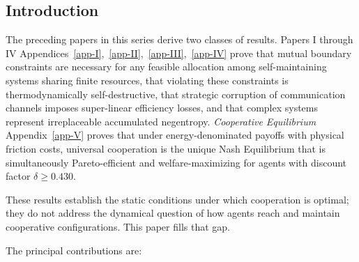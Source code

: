 \documentclass[11pt]{article}
\theoremstyle{plain}
\theoremstyle{definition}
\theoremstyle{remark}
\let\origsubsection\subsection
\renewcommand{\subsection}{\needspace{7\baselineskip}\origsubsection}
\begin{document}
\subsection{Introduction}\label{introduction-6}

The preceding papers in this series derive two classes of results.
Papers I through IV
Appendices~\ref{app-I},~\ref{app-II},~\ref{app-III},~\ref{app-IV} prove
that mutual boundary constraints are necessary for any feasible
allocation among self-maintaining systems sharing finite resources, that
violating these constraints is thermodynamically self-destructive, that
strategic corruption of communication channels imposes super-linear
efficiency losses, and that complex systems represent irreplaceable
accumulated negentropy. \emph{Cooperative Equilibrium}
Appendix~\ref{app-V} proves that under energy-denominated payoffs with
physical friction costs, universal cooperation is the unique Nash
Equilibrium that is simultaneously Pareto-efficient and
welfare-maximizing for agents with discount factor
\(\delta \geq 0.430\).

These results establish the static conditions under which cooperation is
optimal; they do not address the dynamical question of how agents reach
and maintain cooperative configurations. This paper fills that gap.

The principal contributions are:
\end{document}
